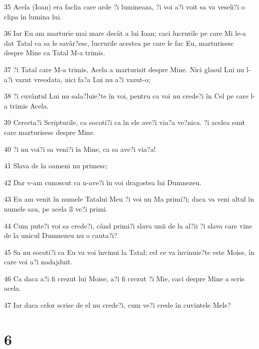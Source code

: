\par 35 Acela (Ioan) era faclia care arde ?i lumineaza, ?i voi a?i voit sa va veseli?i o clipa în lumina lui.
\par 36 Iar Eu am marturie mai mare decât a lui Ioan; caci lucrurile pe care Mi le-a dat Tatal ca sa le savâr?esc, lucrurile acestea pe care le fac Eu, marturisesc despre Mine ca Tatal M-a trimis.
\par 37 ?i Tatal care M-a trimis, Acela a marturisit despre Mine. Nici glasul Lui nu l-a?i vazut vreodata, nici fa?a Lui nu a?i vazut-o;
\par 38 ?i cuvântul Lui nu sala?luie?te în voi, pentru ca voi nu crede?i în Cel pe care l-a trimis Acela.
\par 39 Cerceta?i Scripturile, ca socoti?i ca în ele ave?i via?a ve?nica. ?i acelea sunt care marturisesc despre Mine.
\par 40 ?i nu voi?i sa veni?i la Mine, ca sa ave?i via?a!
\par 41 Slava de la oameni nu primesc;
\par 42 Dar v-am cunoscut ca n-ave?i în voi dragostea lui Dumnezeu.
\par 43 Eu am venit în numele Tatalui Meu ?i voi nu Ma primi?i; daca va veni altul în numele sau, pe acela îl ve?i primi.
\par 44 Cum pute?i voi sa crede?i, când primi?i slava unii de la al?ii ?i slava care vine de la unicul Dumnezeu nu o cauta?i?
\par 45 Sa nu socoti?i ca Eu va voi învinui la Tatal; cel ce va învinuie?te este Moise, în care voi a?i nadajduit.
\par 46 Ca daca a?i fi crezut lui Moise, a?i fi crezut ?i Mie, caci despre Mine a scris acela.
\par 47 Iar daca celor scrise de el nu crede?i, cum ve?i crede în cuvintele Mele?

\chapter{6}

